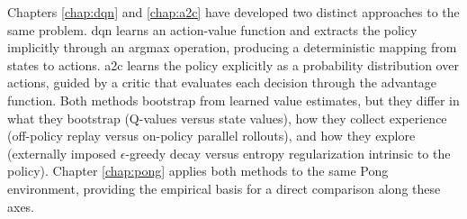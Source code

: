 Chapters \ref{chap:dqn} and \ref{chap:a2c} have developed two distinct approaches to the same problem. \acrshort{dqn} learns an action-value function and extracts the policy implicitly through an argmax operation, producing a deterministic mapping from states to actions. \acrshort{a2c} learns the policy explicitly as a probability distribution over actions, guided by a critic that evaluates each decision through the advantage function. Both methods bootstrap from learned value estimates, but they differ in what they bootstrap (Q-values versus state values), how they collect experience (off-policy replay versus on-policy parallel rollouts), and how they explore (externally imposed $\epsilon$-greedy decay versus entropy regularization intrinsic to the policy). Chapter \ref{chap:pong} applies both methods to the same Pong environment, providing the empirical basis for a direct comparison along these axes.
